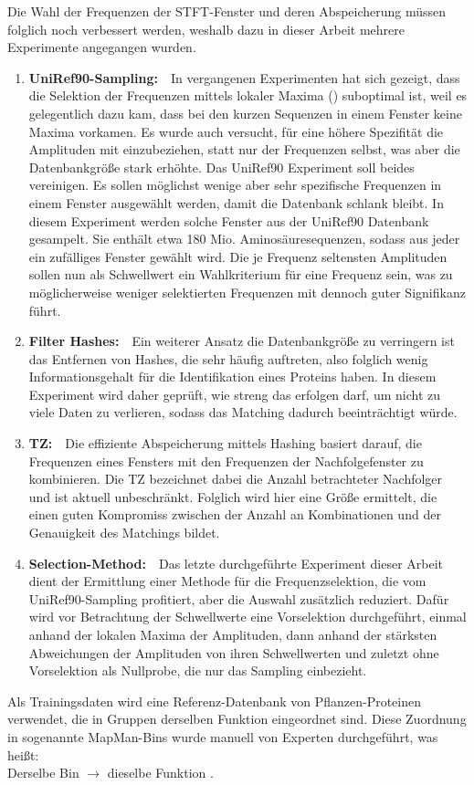     Die Wahl der Frequenzen der \ac{STFT}-Fenster und deren Abspeicherung müssen folglich noch verbessert werden, weshalb dazu in dieser Arbeit mehrere Experimente angegangen wurden.
    \begin{enumerate}
        \item \textbf{UniRef90-Sampling:}\ \ In vergangenen Experimenten hat sich gezeigt, dass die Selektion der Frequenzen mittels lokaler Maxima () suboptimal ist, weil es gelegentlich dazu kam, dass bei den kurzen Sequenzen in einem Fenster keine Maxima vorkamen. Es wurde auch versucht, für eine höhere Spezifität die Amplituden mit einzubeziehen, statt nur der Frequenzen selbst, was aber die Datenbankgröße stark erhöhte. Das UniRef90 Experiment soll beides vereinigen. Es sollen möglichst wenige aber sehr spezifische Frequenzen in einem Fenster ausgewählt werden, damit die Datenbank schlank bleibt. In diesem Experiment werden solche Fenster aus der UniRef90 Datenbank gesampelt. Sie enthält etwa 180 Mio. Aminosäuresequenzen, sodass aus jeder ein zufälliges Fenster gewählt wird. Die je Frequenz seltensten Amplituden sollen nun als Schwellwert ein Wahlkriterium für eine Frequenz sein, was zu möglicherweise weniger selektierten Frequenzen mit dennoch guter Signifikanz führt.
        \item \textbf{Filter Hashes:}\ \ Ein weiterer Ansatz die Datenbankgröße zu verringern ist das Entfernen von Hashes, die sehr häufig auftreten, also folglich wenig Informationsgehalt \autocite{shannon} für die Identifikation eines Proteins haben. In diesem Experiment wird daher geprüft, wie streng das erfolgen darf, um nicht zu viele Daten zu verlieren, sodass das Matching dadurch beeinträchtigt würde. 
        \item \textbf{\acl{TZ}:}\ \ Die effiziente Abspeicherung mittels Hashing basiert darauf, die Frequenzen eines Fensters mit den Frequenzen der Nachfolgefenster zu kombinieren. Die \acl{TZ} bezeichnet dabei die Anzahl betrachteter Nachfolger und ist aktuell unbeschränkt. Folglich wird hier eine Größe ermittelt, die einen guten Kompromiss zwischen der Anzahl an Kombinationen und der Genauigkeit des Matchings bildet.
        \item \textbf{Selection-Method:}\ \ Das letzte durchgeführte Experiment dieser Arbeit dient der Ermittlung einer Methode für die Frequenzselektion, die vom UniRef90-Sampling profitiert, aber die Auswahl zusätzlich reduziert. Dafür wird vor Betrachtung der Schwellwerte eine Vorselektion durchgeführt, einmal anhand der lokalen Maxima der Amplituden, dann anhand der stärksten Abweichungen der Amplituden von ihren Schwellwerten und zuletzt ohne Vorselektion als Nullprobe, die nur das Sampling einbezieht.
    \end{enumerate}
    Als Trainingsdaten wird eine Referenz-Datenbank von Pflanzen-Proteinen verwendet, die in Gruppen derselben Funktion eingeordnet sind. Diese Zuordnung in sogenannte MapMan-Bins wurde manuell von Experten durchgeführt, was heißt:\\Derselbe Bin $\rightarrow$ dieselbe Funktion \autocite{mapman}\autocite{mercator}.
